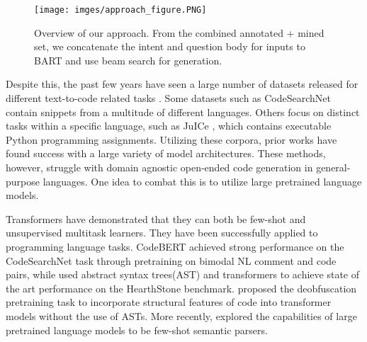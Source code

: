 \documentclass[11pt]{article}
\begin{document}
\begin{figure}[ht]
    \centering
    \texttt{[image: imges/approach\_figure.PNG]}
    \caption{Overview of our approach. From the combined annotated + mined set, we concatenate the intent and question body for inputs to BART\citep{lewis-etal-2020-bart} and use beam search for generation.}
    \label{fig:approach}
\end{figure}
\indent Despite this, the past few years have seen a large number of datasets released for different text-to-code related tasks \citep{ling-etal-2016-latent,iyer-etal-2018-mapping, 10.1145/3178876.3186081,yu-etal-2018-spider, DBLP:journals/corr/abs-2102-04664}. Some datasets such as CodeSearchNet \citep{husain2019codesearchnet} contain snippets from a multitude of different languages. Others focus on distinct tasks within a specific language, such as JuICe \citep{agashe-etal-2019-juice}, which contains executable Python programming assignments. Utilizing these corpora, prior works \citep{suhr-etal-2018-learning, yin-neubig-2017-syntactic,yin-neubig-2018-tranx,Sun_Zhu_Xiong_Sun_Mou_Zhang_2020,hayati-etal-2018-retrieval,yin-neubig-2019-reranking, xu-etal-2020-incorporating,Drain2021GeneratingCW} have found success with a large variety of model architectures. These methods, however, struggle with domain agnostic open-ended code generation in general-purpose languages. One idea to combat this is to utilize large pretrained language models. 

\indent Transformers \citep{vaswani2017attention} have demonstrated that they can both be few-shot \citep{brown2020language} and unsupervised multitask \citep{radford2019language} learners. They have been successfully applied to programming language tasks. CodeBERT achieved strong performance on the CodeSearchNet task through pretraining on bimodal NL comment and code pairs\citep{feng-etal-2020-codebert}, while \citet{Sun_Zhu_Xiong_Sun_Mou_Zhang_2020} used abstract syntax trees(AST) and transformers to achieve state of the art performance on the HearthStone benchmark\citep{ling-etal-2016-latent}. \citet{roziere2021dobf} proposed the deobfuscation pretraining task to incorporate structural features of code into transformer models without the use of ASTs. More recently, \citet{shin2021constrained} explored the capabilities of large pretrained language models to be few-shot semantic parsers. 
\end{document}
